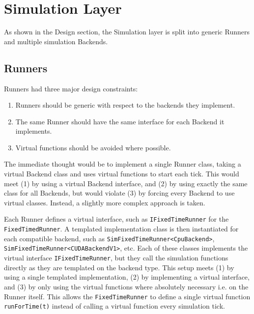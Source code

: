 \section{Simulation Layer}
As shown in the Design section, the Simulation layer is split into generic Runners and multiple simulation Backends.

\subsection{Runners}
Runners had three major design constraints:
\begin{enumerate}
    \item Runners should be generic with respect to the backends they implement.
    \item The same Runner should have the same interface for each Backend it implements.
    \item Virtual functions should be avoided where possible.
\end{enumerate}
The immediate thought would be to implement a single Runner class, taking a virtual Backend class and uses virtual functions to start each tick.
This would meet (1) by using a virtual Backend interface, and (2) by using exactly the same class for all Backends, but would violate (3) by forcing every Backend to use virtual classes.
Instead, a slightly more complex approach is taken.

Each Runner defines a virtual interface, such as \texttt{IFixedTimeRunner} for the \texttt{FixedTimedRunner}.
A templated implementation class is then instantiated for each compatible backend, such as \texttt{SimFixedTimeRunner<CpuBackend>}, \texttt{SimFixedTimeRunner<CUDABackendV1>}, etc.
Each of these classes implements the virtual interface \texttt{IFixedTimeRunner}, but they call the simulation functions directly as they are templated on the backend type.
This setup meets (1) by using a single templated implementation, (2) by implementing a virtual interface, and (3) by only using the virtual functions where absolutely necessary i.e. on the Runner itself.
This allows the \texttt{FixedTimeRunner} to define a single virtual function \texttt{runForTime(t)} instead of calling a virtual function every simulation tick.


